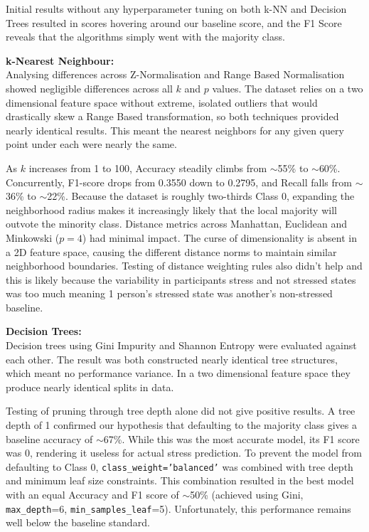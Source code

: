\documentclass[10pt, a4paper]{article}
\begin{document}
Initial results without any hyperparameter tuning on both k-NN and Decision Trees resulted in scores hovering around our baseline score, and the F1 Score reveals that the algorithms simply went with the majority class.

\textbf{k-Nearest Neighbour:}\\
Analysing differences across Z-Normalisation and Range Based Normalisation showed negligible differences across all $k$ and $p$ values. The dataset relies on a two dimensional feature space without extreme, isolated outliers that would drastically skew a Range Based transformation, so both techniques provided nearly identical results. This meant the nearest neighbors for any given query point under each were nearly the same. 

As $k$ increases from 1 to 100, Accuracy steadily climbs from $\sim$55\% to $\sim$60\%. Concurrently, F1-score drops from 0.3550 down to 0.2795, and Recall falls from $\sim$36\% to $\sim$22\%. Because the dataset is roughly two-thirds Class 0, expanding the neighborhood radius makes it increasingly likely that the local majority will outvote the minority class. Distance metrics across Manhattan, Euclidean and Minkowski ($p=4$) had minimal impact. The curse of dimensionality is absent in a 2D feature space, causing the different distance norms to maintain similar neighborhood boundaries. Testing of distance weighting rules also didn't help and this is likely because the variability in participants stress and not stressed states was too much meaning 1 person's stressed state was another's non-stressed baseline.

\textbf{Decision Trees:}\\
Decision trees using Gini Impurity and Shannon Entropy were evaluated against each other. The result was both constructed nearly identical tree structures, which meant no performance variance. In a two dimensional feature space they produce nearly identical splits in data.

Testing of pruning through tree depth alone did not give positive results. A tree depth of 1 confirmed our hypothesis that defaulting to the majority class gives a baseline accuracy of $\sim$67\%. While this was the most accurate model, its F1 score was 0, rendering it useless for actual stress prediction. To prevent the model from defaulting to Class 0, \texttt{class\_weight='balanced'} was combined with tree depth and minimum leaf size constraints. This combination resulted in the best model with an equal Accuracy and F1 score of $\sim$50\% (achieved using Gini, \texttt{max\_depth}=6, \texttt{min\_samples\_leaf}=5). Unfortunately, this performance remains well below the baseline standard.
\end{document}

